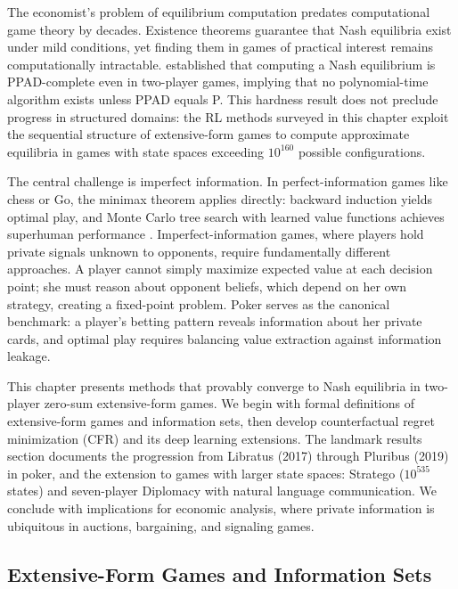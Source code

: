 
The economist's problem of equilibrium computation predates computational game theory by decades. Existence theorems guarantee that Nash equilibria exist under mild conditions, yet finding them in games of practical interest remains computationally intractable. \citet{Daskalakis2009} established that computing a Nash equilibrium is PPAD-complete even in two-player games, implying that no polynomial-time algorithm exists unless PPAD equals P. This hardness result does not preclude progress in structured domains: the RL methods surveyed in this chapter exploit the sequential structure of extensive-form games to compute approximate equilibria in games with state spaces exceeding $10^{160}$ possible configurations.

The central challenge is imperfect information. In perfect-information games like chess or Go, the minimax theorem applies directly: backward induction yields optimal play, and Monte Carlo tree search with learned value functions achieves superhuman performance \citep{Silver2016, Silver2017}. Imperfect-information games, where players hold private signals unknown to opponents, require fundamentally different approaches. A player cannot simply maximize expected value at each decision point; she must reason about opponent beliefs, which depend on her own strategy, creating a fixed-point problem. Poker serves as the canonical benchmark: a player's betting pattern reveals information about her private cards, and optimal play requires balancing value extraction against information leakage.

This chapter presents methods that provably converge to Nash equilibria in two-player zero-sum extensive-form games. We begin with formal definitions of extensive-form games and information sets, then develop counterfactual regret minimization (CFR) and its deep learning extensions. The landmark results section documents the progression from Libratus (2017) through Pluribus (2019) in poker, and the extension to games with larger state spaces: Stratego ($10^{535}$ states) and seven-player Diplomacy with natural language communication. We conclude with implications for economic analysis, where private information is ubiquitous in auctions, bargaining, and signaling games.

\subsection{Extensive-Form Games and Information Sets}

